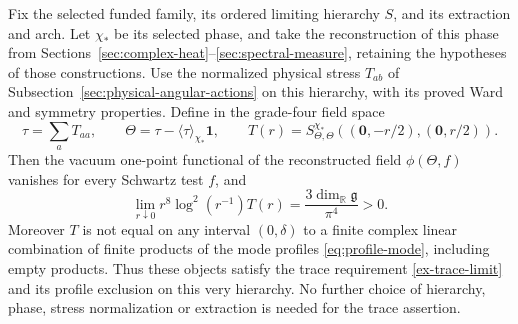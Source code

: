 \begin{theorem}
\label{thm:trace-selected-endpoint}
Fix the selected funded family, its ordered limiting hierarchy $S$, and
its extraction and arch. Let $\chi_*$ be its selected phase, and take
the reconstruction of this phase from
Sections~\ref{sec:complex-heat}--\ref{sec:spectral-measure}, retaining
the hypotheses of those constructions. Use the normalized physical
stress $T_{ab}$ of Subsection~\ref{sec:physical-angular-actions} on this
hierarchy, with its proved Ward and symmetry properties. Define in
the grade-four field space
\[
 \tau=\sum_a T_{aa},\qquad
 \Theta=\tau-\langle\tau\rangle_{\chi_*}\mathbf1,
 \qquad
 T(r)=S^{\chi_*}_{\Theta,\Theta}
       ((\boldsymbol0,-r/2),(\boldsymbol0,r/2)).
\]
Then the vacuum one-point functional of the reconstructed field
$\phi(\Theta,f)$ vanishes for every Schwartz test $f$, and
\[
 \lim_{r\downarrow0}r^8\log^2(r^{-1})T(r)
             =\frac{3\dim_{\mathbb R}\mathfrak g}{\pi^4}>0.
\]
Moreover $T$ is not equal on any interval $(0,\delta)$ to a finite
complex linear combination of finite products of the mode profiles
\eqref{eq:profile-mode}, including empty products. Thus these objects
satisfy the trace requirement \eqref{ex-trace-limit} and its profile
exclusion on this very hierarchy. No further choice of hierarchy,
phase, stress normalization or extraction is needed for the trace
assertion.
\end{theorem}

